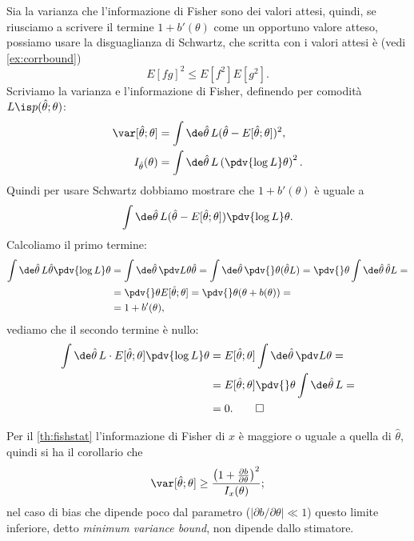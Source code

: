 \begin{solution}
	Sia la varianza che l'informazione di Fisher sono dei valori attesi, quindi,
	se riusciamo a scrivere il termine $1+b'(\theta)$ come un opportuno valore atteso,
	possiamo usare la disguaglianza di Schwartz,
	che scritta con i valori attesi è (vedi \autoref{ex:corrbound})
	\begin{equation*}
		E[fg]^2 \le E[f^2]E[g^2].
	\end{equation*}
	Scriviamo la varianza e l'informazione di Fisher,
	definendo per comodità $L \is p(\hat\theta;\theta)$:
	\begin{align*}
		\var[\hat\theta;\theta]
		&= \int\de\hat\theta\, L (\hat\theta-E[\hat\theta;\theta])^2, \\
		I_{\hat\theta}(\theta)
		&= \int\de\hat\theta\, L \left( \pdv{\log L}\theta \right)^2.
	\end{align*}
	Quindi per usare Schwartz dobbiamo mostrare che $1+b'(\theta)$ è uguale a
	\begin{equation*}
		\int\de\hat\theta\, L (\hat\theta-E[\hat\theta;\theta]) \pdv{\log L}\theta.
	\end{equation*}
	Calcoliamo il primo termine:
	\begin{align*}
		\int \de\hat\theta\,
		L \hat\theta \pdv{\log L}\theta 
		&= \int \de\hat\theta\,
		\pdv L\theta \hat\theta
		= \int \de\hat\theta\,
		\pdv{}\theta (\hat\theta L)
		= \pdv{}\theta \int \de\hat\theta\, \hat\theta L = \\
		&= \pdv{}\theta E[\hat\theta;\theta]
		= \pdv{}\theta (\theta + b(\theta)) = \\
		&= 1 + b'(\theta),
	\end{align*}
	vediamo che il secondo termine è nullo:
	\begin{align*}
		\int \de\hat\theta\,
		L\cdot E[\hat\theta;\theta] \pdv{\log L}\theta
		&= E[\hat\theta;\theta] \int \de\hat\theta\, \pdv L\theta = \\
		&= E[\hat\theta;\theta] \pdv{}\theta \int \de\hat\theta\, L = \\
		&= 0. \qedhere
	\end{align*}
\end{solution}

Per il \autoref{th:fishstat} l'informazione di Fisher di $x$ è maggiore o uguale a quella di $\hat\theta$,
quindi si ha il corollario che
\begin{equation*}
	\var[\hat\theta;\theta] \ge \frac{\left( 1 + \frac{\partial b}{\partial\theta} \right)^2}{I_x(\theta)};
\end{equation*}
nel caso di bias che dipende poco dal parametro ($|\partial b/\partial\theta| \ll 1$)
questo limite inferiore, detto \emph{minimum variance bound}, non dipende dallo stimatore.

